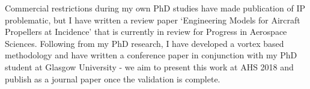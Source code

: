 Commercial restrictions during my own PhD studies have made publication of IP problematic, but I have written a review paper `Engineering Models for Aircraft Propellers at Incidence' that is currently in review for Progress in Aerospace Sciences. Following from my PhD research, I have developed a vortex based methodology and have written a conference paper in conjunction with my PhD student at Glasgow University - we aim to present this work at AHS 2018 and publish as a journal paper once the validation is complete.